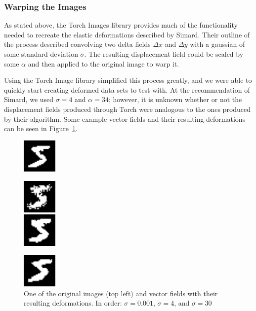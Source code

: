 \documentclass{article}
\begin{document}
\subsubsection{Warping the Images}

As stated above, the Torch Images library provides much of the functionality needed to recreate the elastic deformations described by Simard. Their outline of the process described convolving two delta fields $\Delta x$ and $\Delta y$ with a gaussian of some standard deviation $\sigma$. The resulting displacement field could be scaled by some $\alpha$ and then applied to the original image to warp it.

Using the Torch Image library simplified this process greatly, and we were able to quickly start creating deformed data sets to test with. At the recommendation of Simard, we used $\sigma=4$ and $\alpha=34$; however, it is unknown whether or not the displacement fields produced through Torch were analogous to the ones produced by their algorithm. Some example vector fields and their resulting deformations can be seen in Figure~\ref{fig:deforms}.

\begin{figure}
  \centering
  \includegraphics[width=0.15\textwidth]{original.png}
  
  \includegraphics[width=0.15\textwidth]{deform1.png}\\
  
  \includegraphics[width=0.15\textwidth]{deform2.png}
  
  \includegraphics[width=0.15\textwidth]{deform3.png}
  \caption{One of the original images (top left) and vector fields with their resulting deformations. In order: $\sigma=0.001$, $\sigma=4$, and $\sigma=30$}
  \label{fig:deforms}
\end{figure}
\end{document}
